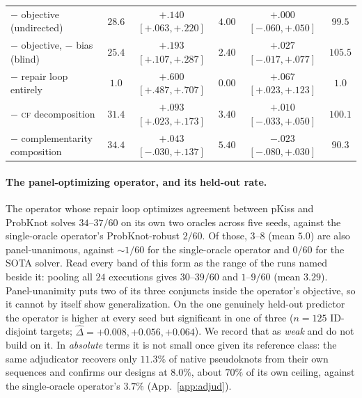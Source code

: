 \documentclass[11pt]{article}
\newcommand{\CF}{\textsc{cf}}
\begin{document}
\begin{table}[t]
\begin{tabularx}{\linewidth}{@{}Lccccc@{}}
\midrule
$-$ objective (undirected) & $28.6$ & $\mathbf{+.140}$ $[{+}.063,{+}.220]$ & $4.00$ & $+.000$ $[{-}.060,{+}.050]$ & $99.5$\\
$-$ objective, $-$ bias (blind) & $25.4$ & $\mathbf{+.193}$ $[{+}.107,{+}.287]$ & $2.40$ & $+.027$ $[{-}.017,{+}.077]$ & $105.5$\\
$-$ repair loop entirely & $1.0$ & $\mathbf{+.600}$ $[{+}.487,{+}.707]$ & $0.00$ & $\mathbf{+.067}$ $[{+}.023,{+}.123]$ & $1.0$\\
$-$ \CF{} decomposition & $31.4$ & $\mathbf{+.093}$ $[{+}.023,{+}.173]$ & $3.40$ & $+.010$ $[{-}.033,{+}.050]$ & $100.1$\\
$-$ complementarity composition & $34.4$ & $+.043$ $[{-}.030,{+}.137]$ & $5.40$ & $-.023$ $[{-}.080,{+}.030]$ & $90.3$\\
\bottomrule
\end{tabularx}
\end{table}

\paragraph{The panel-optimizing operator, and its held-out rate.} The operator whose repair loop optimizes agreement between pKiss and ProbKnot solves $34$--$37/60$ on its own
two oracles across five seeds, against the single-oracle operator's ProbKnot-robust $2/60$. Of those, $3$--$8$
(mean $5.0$) are also panel-unanimous, against $\sim\!1/60$ for the single-oracle operator and $0/60$ for the
SOTA solver. Read every band of this form as the range of the runs named
beside it: pooling all $24$ executions gives $30$--$39/60$ and $1$--$9/60$ (mean $3.29$). Panel-unanimity puts
two of its three conjuncts inside the operator's objective, so it cannot by itself show generalization. On the
one genuinely held-out predictor the operator is higher at every seed but significant in one of three ($n{=}125$
ID-disjoint targets; $\widehat\Delta = {+}0.008, {+}0.056, {+}0.064$). We record that as \emph{weak} and do not
build on it. In \emph{absolute} terms it is not small once given its reference class: the same adjudicator
recovers only $11.3\%$ of native pseudoknots from their own sequences and confirms our designs at $8.0\%$,
about $70\%$ of its own ceiling, against the single-oracle operator's $3.7\%$ (App.~\ref{app:adjud}).
\end{document}
